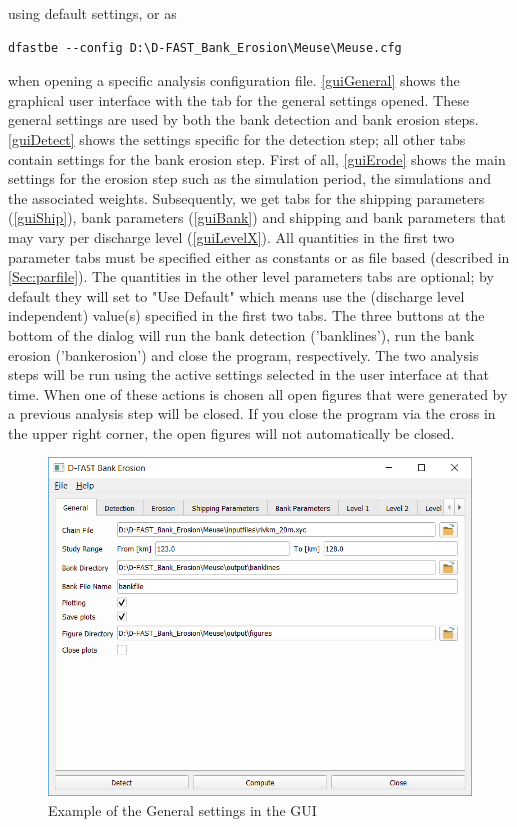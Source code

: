 using default settings, or as

\begin{Verbatim}
dfastbe --config D:\D-FAST_Bank_Erosion\Meuse\Meuse.cfg
\end{Verbatim}

when opening a specific analysis configuration file.
\autoref{guiGeneral} shows the graphical user interface with the tab for the general settings opened.
These general settings are used by both the bank detection and bank erosion steps.
\autoref{guiDetect} shows the settings specific for the detection step; all other tabs contain settings for the bank erosion step.
First of all, \autoref{guiErode} shows the main settings for the erosion step such as the simulation period, the simulations and the associated weights.
Subsequently, we get tabs for the shipping parameters (\autoref{guiShip}), bank parameters (\autoref{guiBank}) and shipping and bank parameters that may vary per discharge level (\autoref{guiLevelX}).
All quantities in the first two parameter tabs must be specified either as constants or as file based (described in \autoref{Sec:parfile}).
The quantities in the other level parameters tabs are optional; by default they will set to "Use Default" which means use the (discharge level independent) value(s) specified in the first two tabs.
The three buttons at the bottom of the dialog will run the bank detection ('banklines'), run the bank erosion ('bankerosion') and close the program, respectively.
The two analysis steps will be run using the active settings selected in the user interface at that time.
When one of these actions is chosen all open figures that were generated by a previous analysis step will be closed.
If you close the program via the cross in the upper right corner, the open figures will not automatically be closed.

\begin{figure}
\center
\includegraphics[width=\textwidth]{figures/gui1.png}
\caption{Example of the General settings in the GUI}
\label{guiGeneral}
\end{figure}

